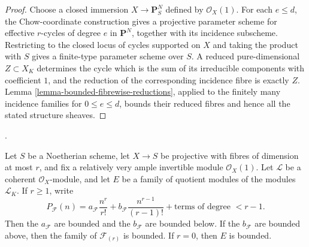 \begin{proof}
Choose a closed immersion $X\to\mathbf{P}^N_S$ defined by
$\mathcal{O}_X(1)$. For each $e\leq d$, the Chow-coordinate construction gives
a projective parameter scheme for effective $r$-cycles of degree $e$ in
$\mathbf{P}^N$, together with its incidence subscheme. Restricting to the
closed locus of cycles supported on $X$ and taking the product with $S$ gives
a finite-type parameter scheme over $S$. A reduced pure-dimensional
$Z\subset X_K$ determines the cycle which is the sum of its irreducible
components with coefficient $1$, and the reduction of the corresponding
incidence fibre is exactly $Z$. Lemma
\ref{lemma-bounded-fibrewise-reductions}, applied to the finitely many
incidence families for $0\leq e\leq d$, bounds their reduced fibres and hence
all the stated structure sheaves.
\end{proof}

\begin{lemma}
\label{lemma-bounded-top-dimensional-small-ambient}
\begin{reference}
\cite[Expos\'e 221, Lemma 2.5, pp. 255--257]{FGA}.
\end{reference}
Let $S$ be a Noetherian scheme, let $X\to S$ be projective with fibres of
dimension at most $r$, and fix a relatively very ample invertible module
$\mathcal{O}_X(1)$. Let $\mathcal{L}$ be a coherent $\mathcal{O}_X$-module,
and let $E$ be a family of quotient modules of the modules $\mathcal{L}_K$.
If $r\geq1$, write
$$
P_{\mathcal{F}}(n)=
a_{\mathcal{F}}\frac{n^r}{r!}+
b_{\mathcal{F}}\frac{n^{r-1}}{(r-1)!}+
\text{terms of degree }<r-1.
$$
Then the $a_{\mathcal{F}}$ are bounded and the $b_{\mathcal{F}}$ are bounded
below. If the $b_{\mathcal{F}}$ are bounded above, then the family of
$\mathcal{F}_{(r)}$ is bounded. If $r=0$, then $E$ is bounded.
\end{lemma}

